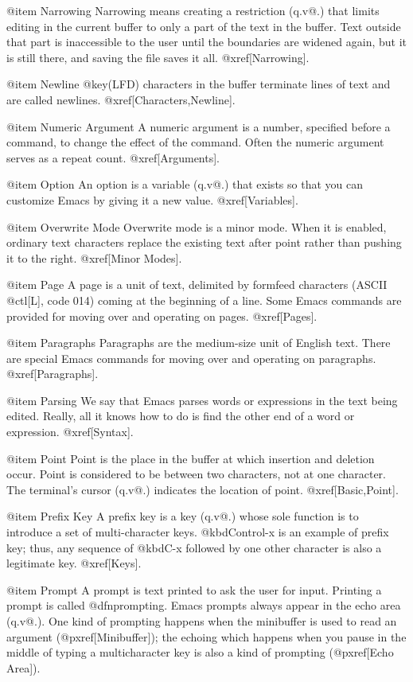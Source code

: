 @item Narrowing
Narrowing means creating a restriction (q.v@.) that limits editing
in the current buffer to only a part of the text in the buffer.  Text
outside that part is inaccessible to the user until the boundaries are
widened again, but it is still there, and saving the file saves it all.
@xref[Narrowing].

@item Newline
@key(LFD) characters in the buffer terminate lines of text and are
called newlines.  @xref[Characters,Newline].

@item Numeric Argument
A numeric argument is a number, specified before a command, to change the
effect of the command.  Often the numeric argument serves as a repeat
count.  @xref[Arguments].

@item Option
An option is a variable (q.v@.) that exists so that you can customize
Emacs by giving it a new value.  @xref[Variables].

@item Overwrite Mode
Overwrite mode is a minor mode.  When it is enabled, ordinary text
characters replace the existing text after point rather than pushing it to
the right.  @xref[Minor Modes].

@item Page
A page is a unit of text, delimited by formfeed characters (ASCII @ctl[L],
code 014) coming at the beginning of a line.  Some Emacs commands are
provided for moving over and operating on pages.  @xref[Pages].

@item Paragraphs
Paragraphs are the medium-size unit of English text.  There are special
Emacs commands for moving over and operating on paragraphs.
@xref[Paragraphs].

@item Parsing
We say that Emacs parses words or expressions in the text being edited.
Really, all it knows how to do is find the other end of a word or
expression.  @xref[Syntax].

@item Point
Point is the place in the buffer at which insertion and deletion occur.
Point is considered to be between two characters, not at one character.
The terminal's cursor (q.v@.) indicates the location of point.
@xref[Basic,Point].

@item Prefix Key
A prefix key is a key (q.v@.) whose sole function is to introduce a set of
multi-character keys.  @kbd{Control-x} is an example of prefix key; thus,
any sequence of @kbd{C-x} followed by one other character is also a
legitimate key.  @xref[Keys].

@item Prompt
A prompt is text printed to ask the user for input.  Printing a prompt is
called @dfn{prompting}.  Emacs prompts always appear in the echo area
(q.v@.).  One kind of prompting happens when the minibuffer is used to read
an argument (@pxref[Minibuffer]); the echoing which happens when you pause
in the middle of typing a multicharacter key is also a kind of
prompting (@pxref[Echo Area]).

